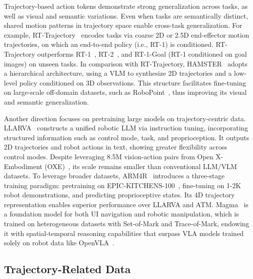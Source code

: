 \documentclass[10pt, a4paper, logo, copyright]{googledeepmind} %
\begin{document}

Trajectory-based action tokens demonstrate strong generalization across tasks, as well as visual and semantic variations. Even when tasks are semantically distinct, shared motion patterns in trajectory space enable cross-task generalization. For example, RT-Trajectory~\cite{rt-trajectory} encodes tasks via coarse 2D or 2.5D end-effector motion trajectories, on which an end-to-end policy (i.e., RT-1) is conditioned. RT-Trajectory outperforms RT-1~\cite{Brohan2022RT1RT}, RT-2~\cite{Brohan2023RT2VM}, and RT-1-Goal (RT-1 conditioned on goal images) on unseen tasks. In comparison with RT-Trajectory, HAMSTER~\cite{li2025hamster} adopts a hierarchical architecture, using a VLM to synthesize 2D trajectories and a low-level policy conditioned on 3D observations. This structure facilitates fine-tuning on large-scale off-domain datasets, such as RoboPoint~\cite{yuanrobopoint}, thus improving its visual and semantic generalization.


Another direction focuses on pretraining large models on trajectory-centric data. LLARVA~\cite{niu2024llarva} constructs a unified robotic LLM via instruction tuning, incorporating structured information such as control mode, task, and proprioception. It outputs 2D trajectories and robot actions in text, showing greater flexibility across control modes. Despite leveraging 8.5M vision-action pairs from Open X-Embodiment (OXE)~\cite{RT-X}, its scale remains smaller than conventional LLM/VLM datasets. To leverage broader datasets, ARM4R~\cite{niu2025pre} introduces a three-stage training paradigm: pretraining on EPIC-KITCHENS-100~\cite{Damen2020RESCALING}, fine-tuning on 1-2K robot demonstrations, and predicting proprioceptive states. 
Its 4D trajectory representation enables superior performance over LLARVA and ATM. Magma~\cite{yang2025magma} is a foundation model for both UI navigation and robotic manipulation, which is trained on heterogeneous datasets with Set-of-Mark and Trace-of-Mark, endowing it with spatial-temporal reasoning capabilities that surpass VLA models trained solely on robot data like OpenVLA~\cite{kim2024openvla}.

\subsection{Trajectory-Related Data}
\end{document}
